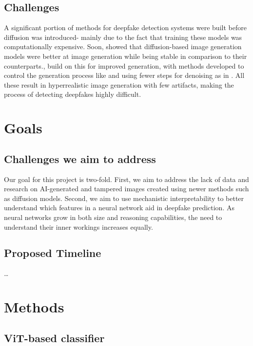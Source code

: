 \documentclass[10pt,twocolumn,letterpaper]{article}
\begin{document}
\subsection{Challenges}
A significant portion of methods for deepfake detection systems were built before diffusion \cite{hoDenoisingDiffusionProbabilistic2020} was introduced- mainly due to the fact that training these models was computationally expensive. Soon, \cite{dhariwalDiffusionModelsBeat2021} showed that diffusion-based image generation models were better at image generation while being stable in comparison to their counterparts.\cite{rombachHighResolutionImageSynthesis2022}, \cite{lipmanFlowMatchingGenerative2023} build on this for improved generation, with methods developed to control the generation process like \cite{ruizDreamBoothFineTuning2023, zhangAddingConditionalControl2023} and using fewer steps for denoising as in \cite{lipmanFlowMatchingGenerative2023}. All these result in hyperrealistic image generation with few artifacts, making the process of detecting deepfakes highly difficult. 


\section{Goals}

\subsection{Challenges we aim to address}
Our goal for this project is two-fold. First, we aim to address the lack of data and research on AI-generated and tampered images created using newer methods such as diffusion models. Second, we aim to use mechanistic interpretability to better understand which features in a neural network aid in deepfake prediction. As neural networks grow in both size and reasoning capabilities, the need to understand their inner workings increases equally.

\subsection{Proposed Timeline}
\ldots 

\section{Methods}
\subsection{ViT-based classifier}
\end{document}
